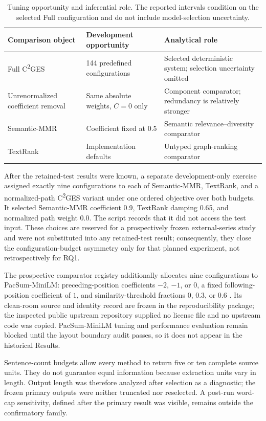 \documentclass[information,article,submit,moreauthors]{Definitions/mdpi}
\newcommand{\cges}{C\textsuperscript{2}GES}
\begin{document}
\begin{table}[H]
\caption{Tuning opportunity and inferential role. The reported intervals condition on the selected Full configuration and do not include model-selection uncertainty.}
\label{tab:tuning-opportunity}\centering\small
\begin{tabular}{p{}p{}p{}}
\toprule
Comparison object & Development opportunity & Analytical role\\
\midrule
Full \cges{} & 144 predefined configurations & Selected deterministic system; selection uncertainty omitted\\
Unrenormalized coefficient removal & Same absolute weights, $C=0$ only & Component comparator; redundancy is relatively stronger\\
Semantic-MMR & Coefficient fixed at 0.5 & Semantic relevance--diversity comparator\\
TextRank & Implementation defaults & Untyped graph-ranking comparator\\
\bottomrule
\end{tabular}
\end{table}

After the retained-test results were known, a separate development-only exercise assigned exactly nine configurations to each of Semantic-MMR, TextRank, and a normalized-path \cges{} variant under one ordered objective over both budgets. It selected Semantic-MMR coefficient 0.9, TextRank damping 0.65, and normalized path weight 0.0. The script records that it did not access the test input. These choices are reserved for a prospectively frozen external-series study and were not substituted into any retained-test result; consequently, they close the configuration-budget asymmetry only for that planned experiment, not retrospectively for RQ1.

The prospective comparator registry additionally allocates nine configurations to PacSum-MiniLM: preceding-position coefficients $-2$, $-1$, or $0$, a fixed following-position coefficient of $1$, and similarity-threshold fractions $0$, $0.3$, or $0.6$ \cite{zheng2019pacsum}. Its clean-room source and identity record are frozen in the reproducibility package; the inspected public upstream repository supplied no license file and no upstream code was copied. PacSum-MiniLM tuning and performance evaluation remain blocked until the layout boundary audit passes, so it does not appear in the historical Results.

Sentence-count budgets allow every method to return five or ten complete source units. They do not guarantee equal information because extraction units vary in length. Output length was therefore analyzed after selection as a diagnostic; the frozen primary outputs were neither truncated nor reselected. A post-run word-cap sensitivity, defined after the primary result was visible, remains outside the confirmatory family.
\end{document}
